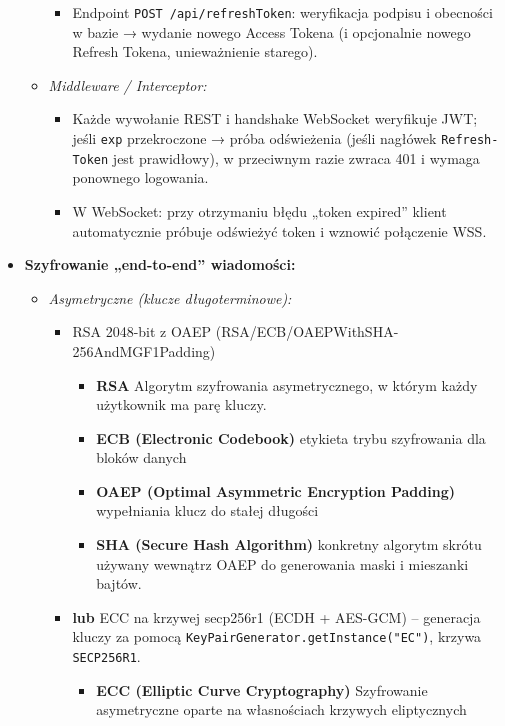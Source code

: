 \documentclass[a4paper,12pt]{article}
\begin{document}
\begin{itemize}
\begin{itemize}
\begin{itemize}
            \item   Endpoint \texttt{POST /api/refreshToken}: weryfikacja podpisu i obecności w bazie → wydanie nowego Access Tokena (i opcjonalnie nowego Refresh Tokena, unieważnienie starego).
        \end{itemize}
        \item \emph{Middleware / Interceptor:}
        \begin{itemize}
            \item   Każde wywołanie REST i handshake WebSocket weryfikuje JWT; jeśli \texttt{exp} przekroczone → próba odświeżenia (jeśli nagłówek \texttt{Refresh-Token} jest prawidłowy), w przeciwnym razie zwraca 401 i wymaga ponownego logowania.
            \item   W WebSocket: przy otrzymaniu błędu „token expired” klient automatycznie próbuje odświeżyć token i wznowić połączenie WSS.
        \end{itemize}
    \end{itemize}
    \item \textbf{Szyfrowanie „end-to-end” wiadomości:}
    \begin{itemize}
        \item \emph{Asymetryczne (klucze długoterminowe):}
        \begin{itemize}
            \item   RSA 2048-bit z OAEP (RSA/ECB/OAEPWithSHA-256AndMGF1Padding)
            \begin{itemize}
                \item \textbf{RSA} Algorytm szyfrowania asymetrycznego, w którym każdy użytkownik ma parę kluczy.
                \item \textbf{ECB (Electronic Codebook)} etykieta trybu szyfrowania dla bloków danych
                \item \textbf{OAEP (Optimal Asymmetric Encryption Padding)} wypełniania klucz do stałej długości
                \item \textbf{SHA (Secure Hash Algorithm)} konkretny algorytm skrótu używany wewnątrz OAEP do generowania maski i mieszanki bajtów.
            \end{itemize}
            \item  \textbf{lub}  ECC na krzywej secp256r1 (ECDH + AES-GCM) – generacja kluczy za pomocą \texttt{KeyPairGenerator.getInstance("EC")}, krzywa \texttt{SECP256R1}.
            \begin{itemize}
                \item \textbf{ECC (Elliptic Curve Cryptography)} Szyfrowanie asymetryczne oparte na własnościach krzywych eliptycznych

\end{itemize}
\end{itemize}
\end{itemize}
\end{itemize}
\end{document}
